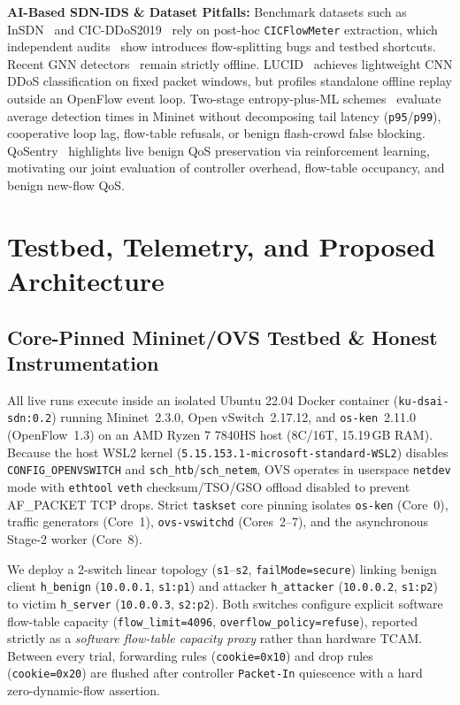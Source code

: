 \documentclass[conference]{IEEEtran}
\begin{document}
\textbf{AI-Based SDN-IDS \& Dataset Pitfalls:} Benchmark datasets such as InSDN~\cite{elsayed2020insdn} and CIC-DDoS2019~\cite{sharafaldin2019cicddos} rely on post-hoc \texttt{CICFlowMeter} extraction, which independent audits~\cite{engelen2021troubleshooting,liu2022errorprevalence,lanvin2023errors} show introduces flow-splitting bugs and testbed shortcuts. Recent GNN detectors~\cite{dadhania2024gnn} remain strictly offline. LUCID~\cite{doriguzzi2020lucid} achieves lightweight CNN DDoS classification on fixed packet windows, but profiles standalone offline replay outside an OpenFlow event loop. Two-stage entropy-plus-ML schemes~\cite{liu2022entropydl,hassan2024entropyml} evaluate average detection times in Mininet without decomposing tail latency (\texttt{p95}/\texttt{p99}), cooperative loop lag, flow-table refusals, or benign flash-crowd false blocking. QoSentry~\cite{khozam2025qosentry} highlights live benign QoS preservation via reinforcement learning, motivating our joint evaluation of controller overhead, flow-table occupancy, and benign new-flow QoS.

\section{Testbed, Telemetry, and Proposed Architecture}

\subsection{Core-Pinned Mininet/OVS Testbed \& Honest Instrumentation}
All live runs execute inside an isolated Ubuntu 22.04 Docker container (\texttt{ku-dsai-sdn:0.2}) running Mininet~2.3.0, Open vSwitch~2.17.12, and \texttt{os-ken}~2.11.0 (OpenFlow~1.3) on an AMD Ryzen 7 7840HS host (8C/16T, 15.19\,GB RAM). Because the host WSL2 kernel (\texttt{5.15.153.1-microsoft-standard-WSL2}) disables \texttt{CONFIG\_OPENVSWITCH} and \texttt{sch\_htb}/\texttt{sch\_netem}, OVS operates in userspace \texttt{netdev} mode with \texttt{ethtool} \texttt{veth} checksum/TSO/GSO offload disabled to prevent AF\_PACKET TCP drops. Strict \texttt{taskset} core pinning isolates \texttt{os-ken} (Core~0), traffic generators (Core~1), \texttt{ovs-vswitchd} (Cores~2--7), and the asynchronous Stage-2 worker (Core~8).

We deploy a 2-switch linear topology (\texttt{s1}--\texttt{s2}, \texttt{failMode=secure}) linking benign client \texttt{h\_benign} (\texttt{10.0.0.1}, \texttt{s1:p1}) and attacker \texttt{h\_attacker} (\texttt{10.0.0.2}, \texttt{s1:p2}) to victim \texttt{h\_server} (\texttt{10.0.0.3}, \texttt{s2:p2}). Both switches configure explicit software flow-table capacity (\texttt{flow\_limit=4096}, \texttt{overflow\_policy=refuse}), reported strictly as a \emph{software flow-table capacity proxy} rather than hardware TCAM. Between every trial, forwarding rules (\texttt{cookie=0x10}) and drop rules (\texttt{cookie=0x20}) are flushed after controller \texttt{Packet-In} quiescence with a hard zero-dynamic-flow assertion.
\end{document}

